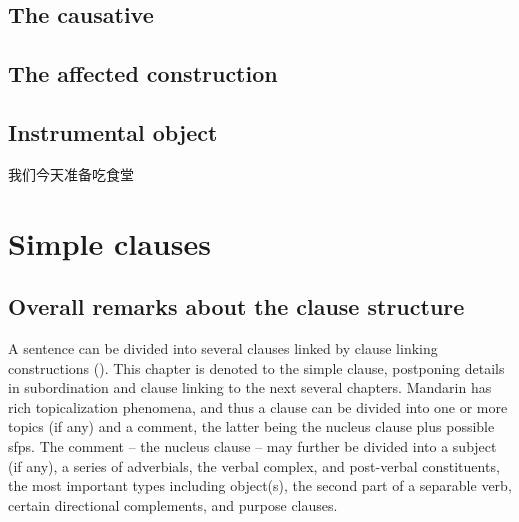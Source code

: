 \documentclass[UTF8, a4paper, oneside, scheme=plain]{ctexrep}
\begin{document}
\section{The causative}

\section{The affected construction}



\section{Instrumental object}

\begin{exe}
    \ex 我们今天准备吃食堂
\end{exe}

\chapter{Simple clauses}

\section{Overall remarks about the clause structure}

A sentence can be divided into several clauses linked by clause linking constructions 
().
This chapter is denoted to the simple clause,
postponing details in subordination and clause linking to the next several chapters.
Mandarin has rich topicalization phenomena,
and thus a clause can be divided into
one or more topics (if any) and a comment,
the latter being the nucleus clause
plus possible \acl{sfp}s.
The comment -- the nucleus clause -- may further be divided into a subject (if any),
a series of adverbials, 
the verbal complex, and post-verbal constituents,
the most important types including object(s), 
the second part of a separable verb,
certain directional complements,
and purpose clauses.
\end{document}
